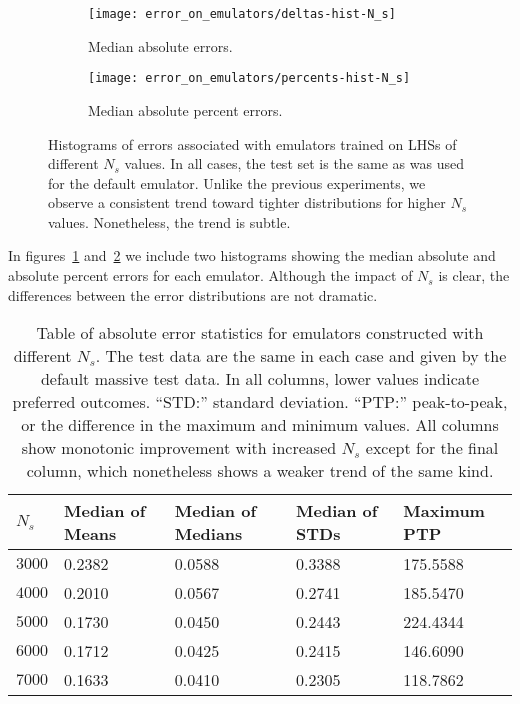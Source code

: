 \begin{figure}[ht!]
    \begin{subfigure}{0.35 \textheight}
    \centering
 		\texttt{[image: error\_on\_emulators/deltas-hist-N\_s]}
 		\caption{Median absolute errors.}
 		\label{fig: Ns_experiment_deltas}
    \end{subfigure}
    \begin{subfigure}{0.35 \textheight}
    \centering
 		\texttt{[image: error\_on\_emulators/percents-hist-N\_s]}
 		\caption{Median absolute percent errors.}
 		\label{fig: Ns_experiment_percerr}
    \end{subfigure}
        \centering
    \caption[Impact of $N_s$ on Accuracy]
    		{Histograms of errors associated with emulators trained on LHSs of
    			different $N_s$ values. In all cases, the test set is the same as
    			was used for the default emulator.
    			Unlike the previous experiments, we observe a consistent
    			trend toward tighter distributions for higher $N_s$ values.
    			Nonetheless, the trend is subtle.}
    \label{fig: Ns_experiment}
\end{figure}

In figures~\ref{fig: Ns_experiment_deltas}
and~\ref{fig: Ns_experiment_percerr} we include two histograms showing the
median absolute and absolute percent errors for each emulator. Although the
impact of $N_s$ is clear, the differences between the error distributions
are not dramatic.

\begin{table}[ht!]
\centering
\begin{tabular}{l|l|l|l|l}
\hline
$N_s$ & Median of Means & Median of Medians & Median of STDs & Maximum PTP \\ \hline
$3000$ & 0.2382 & 0.0588 & 0.3388 & 175.5588 \\
$4000$ & 0.2010 & 0.0567 & 0.2741 & 185.5470 \\
$5000$ & 0.1730 & 0.0450 & 0.2443 & 224.4344 \\
$6000$ & 0.1712 & 0.0425 & 0.2415 & 146.6090 \\
$7000$ & 0.1633 & 0.0410 & 0.2305 & 118.7862 \\
\end{tabular}
	\cprotect\caption[$N_s$ Experiment: Deltas Statistics]{Table of
		absolute error statistics
		for emulators constructed with different $N_s$.
		The test data are the same in each case and given by the default
		massive test data.
		In all columns,
		lower values indicate preferred outcomes. ``STD:'' standard
		deviation. ``PTP:'' peak-to-peak, or the difference in the maximum
		and minimum values.
		All columns show monotonic improvement with increased $N_s$ except
		for the final column, which nonetheless shows a weaker trend of the
		same kind.}
 \label{tab: Ns_experiment_deltas_stats}
\end{table}

